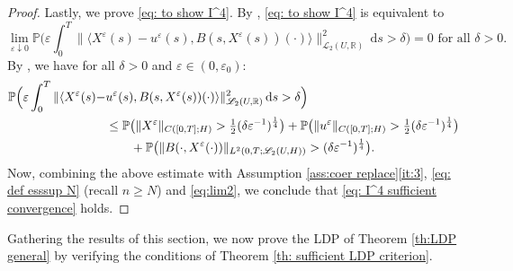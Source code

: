 \documentclass{amsart}
\newcommand{\dd}{\,\mathrm{d}}
\newcommand{\UH}{\mathscr{L}_2(U,H)}
\newcommand{\<}{\langle}
\newcommand{\?}{\rangle}
\theoremstyle{plain}
\theoremstyle{remark}
\theoremstyle{plain}
\numberwithin{equation}{section}
\def\R{{\mathbb R}}
\renewcommand{\P}{\mathbb{P}}
\newcommand{\eps}{\varepsilon}
\begin{document}
\begin{proof}
    Lastly, we prove \eqref{eq: to show I^4}.  
    By  \cite[Prop.\ 18.6]{kallenberg21}, \eqref{eq: to show I^4} is equivalent to
    \begin{equation}\label{eq: I^4 sufficient convergence}
    \lim_{\eps\downarrow0}\P\Big(\eps\int_0^T\|\<X^\eps(s)-u^{\eps}(s),B(s,X^\eps(s))(\cdot)\?\|_{\mathscr{L}_2(U,\R)}^2\dd s>\delta\Big)=0 \text{ for all } \delta>0.
    \end{equation}
    By \cite[(4.39), (4.40)]{TV24}, we have   for all $\delta>0$ and $\eps\in(0,\eps_0)$:
    \begin{align*}
    \P\Big(\eps\int_0^T\|\<X^\eps(s)-&u^{\eps}(s),B(s,X^\eps(s))(\cdot)\?\|_{\mathscr{L}_2(U,\R)}^2\dd s>\delta\Big)\notag\\
    &\leq \P\big(\|X^\eps\|_{C([0,T];H)}>\tfrac{1}{2}({\delta}{\eps}^{-1})^{\frac{1}{4}}\big)+\P\big(\|u^{\eps}\|_{C([0,T];H)}>\tfrac{1}{2}({\delta}{\eps}^{-1})^{\frac{1}{4}}\big)\notag\\
    &\qquad+ \P\big(\| B(\cdot,X^\eps(\cdot))\|_{L^2(0,T;\UH)} >({\delta}{\eps}^{-1})^{\frac{1}{4}}\big). 
    \end{align*} 
    Now, combining the above estimate with Assumption \ref{ass:coer replace}\ref{it:3}, \eqref{eq: def esssup N} (recall $n\geq N$) and \eqref{eq:lim2}, we conclude that   \eqref{eq: I^4 sufficient convergence} holds.
\end{proof}


Gathering the results of this section, we now prove the LDP of Theorem \ref{th:LDP general} by verifying the conditions of Theorem \ref{th: sufficient LDP criterion}. 
 
\end{document}
